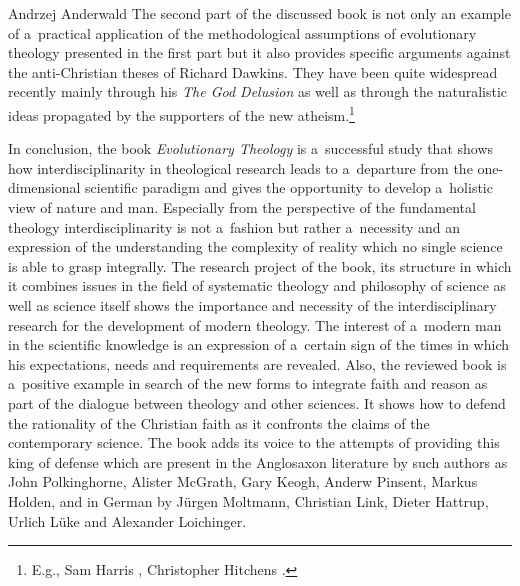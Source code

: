\begin{newrevengenv}{Andrzej Anderwald}
The second part of the discussed book is not only an example of a~practical application of the methodological assumptions of evolutionary theology presented in the first part but it also provides specific arguments against the anti-Christian theses of Richard Dawkins. They have been quite widespread recently mainly through his \textit{The God Delusion} \parencite*{Dawkins2006TheGodDelusion} as well as through the naturalistic ideas propagated by the supporters of the new atheism.\footnote{E.g., Sam Harris
\parencites*[][]{harris_end_2004, harris_letter_2006}, %
 Christopher Hitchens 
\parencite*[][]{hitchens_god_2007}.%
}



In conclusion, the book \textit{Evolutionary Theology} is a~successful study that shows how interdisciplinarity in theological research leads to a~departure from the one-dimensional scientific paradigm and gives the opportunity to develop a~holistic view of nature and man. Especially from the perspective of the fundamental theology interdisciplinarity is not a~fashion but rather a~necessity and an expression of the understanding the complexity of reality which no single science is able to grasp integrally. The research project of the book, its structure in which it combines issues in the field of systematic theology and philosophy of science as well as science itself shows the importance and necessity of the interdisciplinary research for the development of modern theology. The interest of a~modern man in the scientific knowledge is an expression of a~certain sign of the times in which his expectations, needs and requirements are revealed. Also, the reviewed book is a~positive example in search of the new forms to integrate faith and reason as part of the dialogue between theology and other sciences. It shows how to defend the rationality of the Christian faith as it confronts the claims of the contemporary science. The book adds its voice to the attempts of providing this king of defense which are present in the Anglosaxon literature by such authors as John Polkinghorne, Alister McGrath, Gary Keogh, Anderw Pinsent, Markus Holden, and in German by Jürgen Moltmann, Christian Link, Dieter Hattrup, Urlich Lüke and Alexander Loichinger.




\end{newrevengenv}
